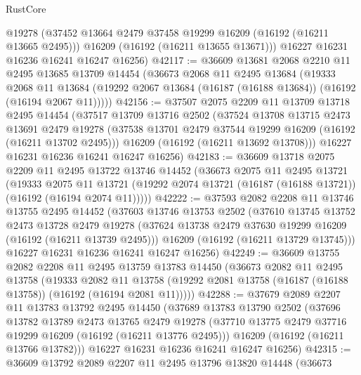 \begin{lexlean}{RustCore}
\begin{coremodule}
        @19278
        (@37452 @13664 @2479 @37458 @19299 @16209 (@16192 (@16211 @13665 @2495)))
        @16209
        (@16192 (@16211 @13655 @13671)))
      @16227
      @16231
      @16236
      @16241
      @16247
      @16256)
@42117 := @36609
    @13681
    @2068
    @2210
    @11
    @2495
    @13685
    @13709
    @14454
    (@36673
      @2068
      @11
      @2495
      @13684
      (@19333
        @2068
        @11
        @13684
        (@19292 @2067 @13684 (@16187 (@16188 @13684)) (@16192 (@16194 @2067 @11)))))
@42156 := @37507
    @2075
    @2209
    @11
    @13709
    @13718
    @2495
    @14454
    (@37517
      @13709
      @13716
      @2502
      (@37524
        @13708
        @13715
        @2473
        @13691
        @2479
        @19278
        (@37538 @13701 @2479 @37544 @19299 @16209 (@16192 (@16211 @13702 @2495)))
        @16209
        (@16192 (@16211 @13692 @13708)))
      @16227
      @16231
      @16236
      @16241
      @16247
      @16256)
@42183 := @36609
    @13718
    @2075
    @2209
    @11
    @2495
    @13722
    @13746
    @14452
    (@36673
      @2075
      @11
      @2495
      @13721
      (@19333
        @2075
        @11
        @13721
        (@19292 @2074 @13721 (@16187 (@16188 @13721)) (@16192 (@16194 @2074 @11)))))
@42222 := @37593
    @2082
    @2208
    @11
    @13746
    @13755
    @2495
    @14452
    (@37603
      @13746
      @13753
      @2502
      (@37610
        @13745
        @13752
        @2473
        @13728
        @2479
        @19278
        (@37624 @13738 @2479 @37630 @19299 @16209 (@16192 (@16211 @13739 @2495)))
        @16209
        (@16192 (@16211 @13729 @13745)))
      @16227
      @16231
      @16236
      @16241
      @16247
      @16256)
@42249 := @36609
    @13755
    @2082
    @2208
    @11
    @2495
    @13759
    @13783
    @14450
    (@36673
      @2082
      @11
      @2495
      @13758
      (@19333
        @2082
        @11
        @13758
        (@19292 @2081 @13758 (@16187 (@16188 @13758)) (@16192 (@16194 @2081 @11)))))
@42288 := @37679
    @2089
    @2207
    @11
    @13783
    @13792
    @2495
    @14450
    (@37689
      @13783
      @13790
      @2502
      (@37696
        @13782
        @13789
        @2473
        @13765
        @2479
        @19278
        (@37710 @13775 @2479 @37716 @19299 @16209 (@16192 (@16211 @13776 @2495)))
        @16209
        (@16192 (@16211 @13766 @13782)))
      @16227
      @16231
      @16236
      @16241
      @16247
      @16256)
@42315 := @36609
    @13792
    @2089
    @2207
    @11
    @2495
    @13796
    @13820
    @14448
    (@36673

\end{coremodule}
\end{lexlean}
